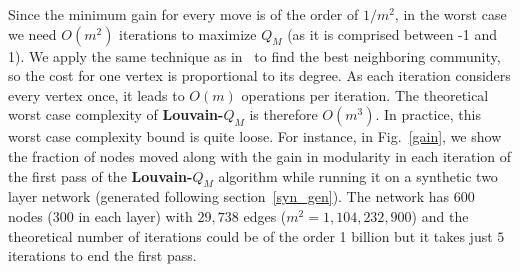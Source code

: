 Since the minimum gain for every move is of the order of $1/m^2$, in the worst
case we need $O(m^2)$ iterations to maximize $Q_M$ (as it is comprised between -1 and 1).
We apply the same technique as in~\cite{blondel2008fast} to find the best neighboring community, so the cost for one vertex
is proportional to its degree. As each iteration considers every vertex once, it leads to $O(m)$ operations per iteration. The
theoretical worst case complexity of \textbf{Louvain-$Q_M$} is therefore $O(m^3)$.
In practice, this worst case complexity bound is quite loose. For instance, in
Fig.~\ref{gain}, we show the fraction of nodes moved along with the gain in
modularity in each iteration of the first pass of the \textbf{Louvain-$Q_M$} algorithm
while running it on a synthetic two layer network (generated following section~\ref{syn_gen}). The network has $600$ nodes ($300$ in
each layer) with $29,738$ edges ($m^2 = 1,104,232,900$) and the theoretical number of iterations could be of the
order 1 billion but it takes just $5$ iterations to end the first pass.



